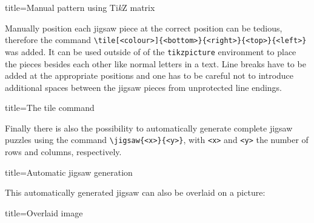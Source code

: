 \documentclass[parskip=half]{scrartcl}
\begin{document}
\begin{tcblisting}{title={Manual pattern using Ti\emph{k}Z matrix}}
\end{tcblisting}

Manually position each jigsaw piece at the correct position can be tedious, therefore the command \lstinline|\tile[<colour>]{<bottom>}{<right>}{<top>}{<left>}| was added. It can be used outside of of the \lstinline|tikzpicture| environment to place the pieces besides each other like normal letters in a text. Line breaks have to be added at the appropriate positions and one has to be careful not to introduce additional spaces between the jigsaw pieces from unprotected line endings.

\begin{tcblisting}{title={The tile command}}
%
%

%
%

%
%
\end{tcblisting}

Finally there is also the possibility to automatically generate complete jigsaw puzzles using the command \lstinline|\jigsaw{<x>}{<y>}|, with \lstinline|<x>| and \lstinline|<y>| the number of rows and columns, respectively.

\begin{tcblisting}{title={Automatic jigsaw generation}}
\end{tcblisting}

This automatically generated jigsaw can also be overlaid on a picture:

\begin{tcblisting}{title={Overlaid image}}
\end{tcblisting}
\end{document}
